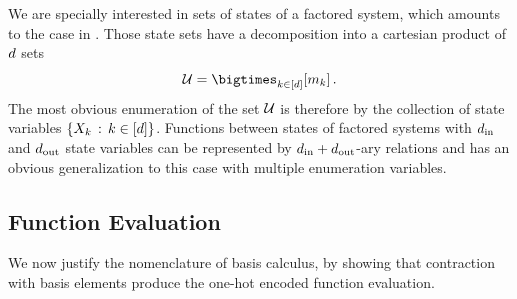 We are specially interested in sets of states of a factored system, which amounts to the case in .
Those state sets have a decomposition into a cartesian product of $d$ sets
\[ \arbset = \facstates \, . \]
The most obvious enumeration of the set $\mathcal{U}$ is therefore by the collection of state variables $\{X_{k}\,:\, k\in[d] \}$.
Functions between states of factored systems with $d_{\mathrm{in}}$ and $d_{\mathrm{out}}$ state variables can be represented by $d_{\mathrm{in}}+d_{\mathrm{out}}$-ary relations and  has an obvious generalization to this case with multiple enumeration variables.

%
%



\subsection{Function Evaluation}

We now justify the nomenclature of basis calculus, by showing that contraction with basis elements produce the one-hot encoded function evaluation.

